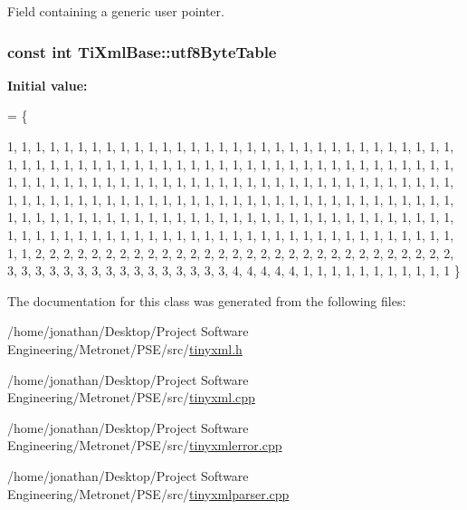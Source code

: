 Field containing a generic user pointer. 

\subsubsection[{\texorpdfstring{utf8\+Byte\+Table}{utf8ByteTable}}]{\setlength{\rightskip}{0pt plus 5cm}const int Ti\+Xml\+Base\+::utf8\+Byte\+Table\hspace{0.3cm}{\ttfamily [static]}}\hypertarget{class_ti_xml_base_ac8c86058137bdb4b413c3eca58f2d467}{}\label{class_ti_xml_base_ac8c86058137bdb4b413c3eca58f2d467}
{\bfseries Initial value\+:}
\begin{DoxyCode}
= 
\{
    
        1,  1,  1,  1,  1,  1,  1,  1,  1,  1,  1,  1,  1,  1,  1,  1,  
        1,  1,  1,  1,  1,  1,  1,  1,  1,  1,  1,  1,  1,  1,  1,  1,  
        1,  1,  1,  1,  1,  1,  1,  1,  1,  1,  1,  1,  1,  1,  1,  1,  
        1,  1,  1,  1,  1,  1,  1,  1,  1,  1,  1,  1,  1,  1,  1,  1,  
        1,  1,  1,  1,  1,  1,  1,  1,  1,  1,  1,  1,  1,  1,  1,  1,  
        1,  1,  1,  1,  1,  1,  1,  1,  1,  1,  1,  1,  1,  1,  1,  1,  
        1,  1,  1,  1,  1,  1,  1,  1,  1,  1,  1,  1,  1,  1,  1,  1,  
        1,  1,  1,  1,  1,  1,  1,  1,  1,  1,  1,  1,  1,  1,  1,  1,  
        1,  1,  1,  1,  1,  1,  1,  1,  1,  1,  1,  1,  1,  1,  1,  1,  
        1,  1,  1,  1,  1,  1,  1,  1,  1,  1,  1,  1,  1,  1,  1,  1,  
        1,  1,  1,  1,  1,  1,  1,  1,  1,  1,  1,  1,  1,  1,  1,  1,  
        1,  1,  1,  1,  1,  1,  1,  1,  1,  1,  1,  1,  1,  1,  1,  1,  
        1,  1,  2,  2,  2,  2,  2,  2,  2,  2,  2,  2,  2,  2,  2,  2,  
        2,  2,  2,  2,  2,  2,  2,  2,  2,  2,  2,  2,  2,  2,  2,  2,  
        3,  3,  3,  3,  3,  3,  3,  3,  3,  3,  3,  3,  3,  3,  3,  3,  
        4,  4,  4,  4,  4,  1,  1,  1,  1,  1,  1,  1,  1,  1,  1,  1   
\}
\end{DoxyCode}


The documentation for this class was generated from the following files\+:\begin{DoxyCompactItemize}
\item 
/home/jonathan/\+Desktop/\+Project Software Engineering/\+Metronet/\+P\+S\+E/src/\hyperlink{tinyxml_8h}{tinyxml.\+h}\item 
/home/jonathan/\+Desktop/\+Project Software Engineering/\+Metronet/\+P\+S\+E/src/\hyperlink{tinyxml_8cpp}{tinyxml.\+cpp}\item 
/home/jonathan/\+Desktop/\+Project Software Engineering/\+Metronet/\+P\+S\+E/src/\hyperlink{tinyxmlerror_8cpp}{tinyxmlerror.\+cpp}\item 
/home/jonathan/\+Desktop/\+Project Software Engineering/\+Metronet/\+P\+S\+E/src/\hyperlink{tinyxmlparser_8cpp}{tinyxmlparser.\+cpp}\end{DoxyCompactItemize}
